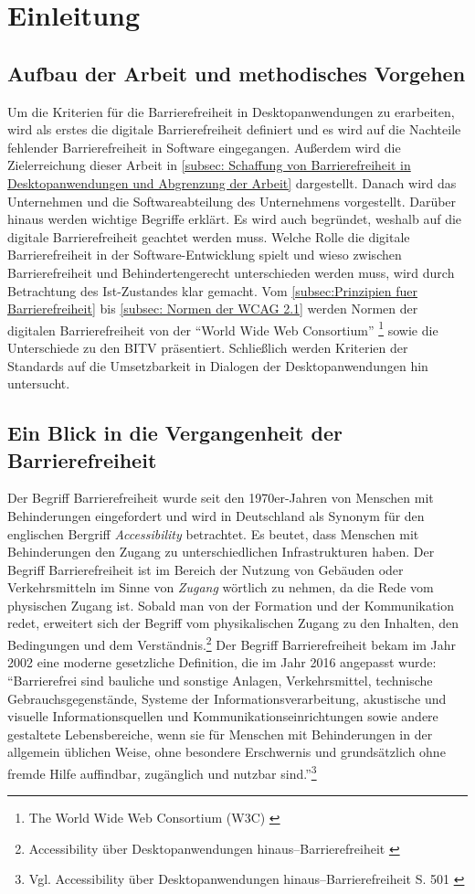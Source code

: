 \section{Einleitung}

\subsection{Aufbau der Arbeit und methodisches Vorgehen}
Um die Kriterien für die Barrierefreiheit in Desktopanwendungen zu erarbeiten, wird als erstes die digitale Barrierefreiheit definiert und es wird auf die Nachteile fehlender Barrierefreiheit in Software eingegangen. Außerdem wird die Zielerreichung dieser Arbeit in \cref{subsec: Schaffung von Barrierefreiheit in Desktopanwendungen und Abgrenzung der Arbeit} dargestellt. Danach wird das Unternehmen und die Softwareabteilung des Unternehmens vorgestellt. Darüber hinaus werden wichtige Begriffe erklärt. Es wird auch begründet, weshalb auf die digitale Barrierefreiheit geachtet werden muss. Welche Rolle die digitale Barrierefreiheit in der Software-Entwicklung spielt und wieso zwischen Barrierefreiheit und Behindertengerecht unterschieden werden muss, wird durch Betrachtung des Ist-Zustandes klar gemacht. Vom \cref{subsec:Prinzipien fuer Barrierefreiheit} bis \cref{subsec: Normen der WCAG 2.1} werden Normen der digitalen Barrierefreiheit von der "`World Wide Web Consortium"' \footnote{The World Wide Web Consortium (W3C) \cite{w3c}} sowie die Unterschiede zu den \ac{BITV} präsentiert. Schließlich werden Kriterien der Standards auf die Umsetzbarkeit in Dialogen der Desktopanwendungen hin untersucht.

\subsection{Ein Blick in die Vergangenheit der Barrierefreiheit}
Der Begriff Barrierefreiheit wurde seit den 1970er-Jahren von Menschen mit Behinderungen eingefordert und wird in Deutschland als Synonym für den englischen Bergriff \textit{Accessibility} betrachtet. Es beutet, dass Menschen mit Behinderungen den Zugang zu unterschiedlichen Infrastrukturen haben. Der Begriff Barrierefreiheit ist im Bereich der Nutzung von Gebäuden oder Verkehrsmitteln im Sinne von \textit{Zugang} wörtlich zu nehmen, da die Rede vom physischen Zugang ist. Sobald man von der Formation und der Kommunikation redet, erweitert sich der Begriff vom physikalischen Zugang zu den Inhalten, den Bedingungen und dem Verständnis.\footnote{Accessibility über Desktopanwendungen hinaus–Barrierefreiheit \cite{buhler2017accessibility}} Der Begriff Barrierefreiheit bekam im Jahr 2002 eine moderne gesetzliche Definition, die im Jahr 2016 angepasst wurde: "`Barrierefrei sind bauliche und sonstige Anlagen, Verkehrsmittel, technische Gebrauchsgegenstände, Systeme der Informationsverarbeitung, akustische und visuelle Informationsquellen und Kommunikationseinrichtungen sowie andere gestaltete Lebensbereiche, wenn sie für Menschen mit Behinderungen in der allgemein üblichen Weise, ohne besondere Erschwernis und grundsätzlich ohne fremde Hilfe auffindbar, zugänglich und nutzbar sind."'\footnote{Vgl. Accessibility über Desktopanwendungen hinaus–Barrierefreiheit S. 501 \cite{buhler2017accessibility}}

